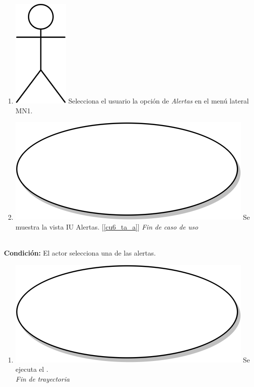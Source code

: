 \begin{enumerate}
\item {\includegraphics[scale=.1]{Capitulo3/img/actor.png} Selecciona el usuario la opción de \textit{Alertas} en el menú lateral MN1.}
\item {\includegraphics[scale=.05]{Capitulo3/img/proceso.png} Se muestra la vista IU Alertas. [\ref{cu6_ta_a}]}
  \textit{Fin de caso de uso} \\  
\end{enumerate}

\textbf{} \\
\textbf{Condición:} El actor selecciona una de las alertas. \\
 \begin{enumerate}[label=A\arabic*]
    \item {\includegraphics[scale=.05]{Capitulo3/img/proceso.png} Se ejecuta el \textbf{}.} \\
    \textit{Fin de trayectoria} \\
\end{enumerate}

